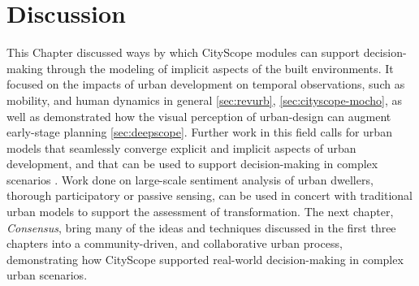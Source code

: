 {    %
    
    

    \section{Discussion}
     {
      This Chapter discussed ways by which CityScope modules can support decision-making through the modeling of implicit aspects of the built environments. It focused on the impacts of urban development on temporal observations, such as mobility, and human dynamics in general \eqref{sec:revurb}, \eqref{sec:cityscope-mocho}, as well as demonstrated how the visual perception of urban-design can augment early-stage planning \eqref{sec:deepscope}. Further work in this field calls for urban models that seamlessly converge explicit and implicit aspects of urban development, and that can be used to support decision-making in complex scenarios \cite{dubey2016deep, moro2021mobility}. Work done on large-scale sentiment analysis of urban dwellers, thorough participatory or passive sensing, can be used in concert with traditional urban models to support the assessment of transformation. The next chapter, \textit{Consensus}, bring many of the ideas and techniques discussed in the first three chapters into a community-driven, and collaborative urban process, demonstrating how CityScope supported real-world decision-making in complex urban scenarios.
     }
}

